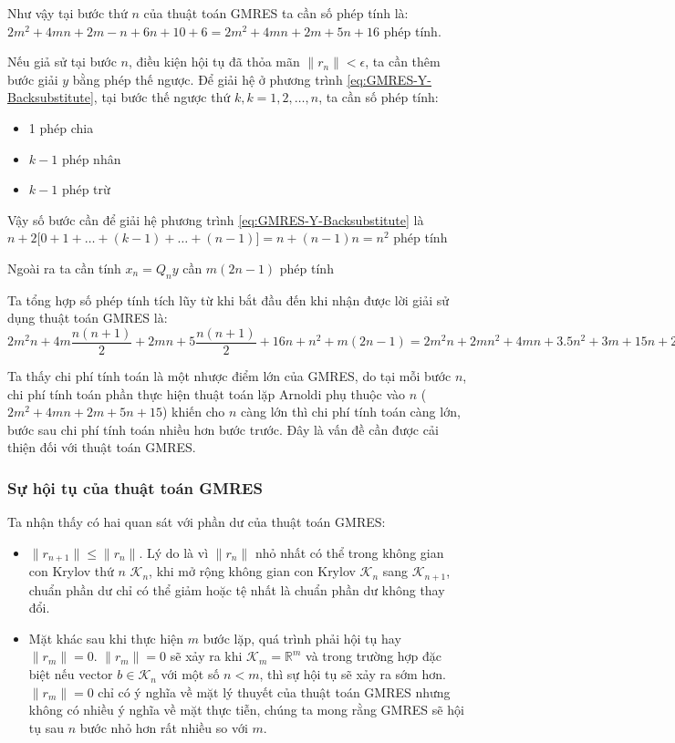 \documentclass[14pt, a4paper]{article}
\numberwithin{equation}{section}
\numberwithin{algorithm}{section}
\numberwithin{figure}{section}
\numberwithin{dl}{section}
\numberwithin{md}{section}
\numberwithin{bd}{section}
\numberwithin{dn}{section}
\begin{document}
Như vậy tại bước thứ $n$ của thuật toán GMRES ta cần số phép tính là: $2m^2+4mn+2m-n + 6n+10 + 6=2m^2+4mn+2m+5n+16$ phép tính.

Nếu giả sử tại bước $n$, điều kiện hội tụ đã thỏa mãn $\lVert r_n \rVert < \epsilon$, ta cần thêm bước giải $y$ bằng phép thế ngược. Để giải hệ ở phương trình \ref{eq:GMRES-Y-Backsubstitute}, tại bước thế ngược thứ $k, k=1,2,\dots,n$, ta cần số phép tính:
\begin{itemize}
    \item 1 phép chia
    \item $k-1$ phép nhân
    \item $k-1$ phép trừ
\end{itemize}

Vậy số bước cần để giải hệ phương trình \ref{eq:GMRES-Y-Backsubstitute} là $n + 2\lbrack 0 + 1 + \dots + (k-1) + \dots + (n-1)\rbrack=n+(n-1)n=n^2$ phép tính

Ngoài ra ta cần tính $x_n = Q_n y$ cần $m(2n-1)$ phép tính

Ta tổng hợp số phép tính tích lũy từ khi bắt đầu đến khi nhận được lời giải sử dụng thuật toán GMRES là: $2m^2 n + 4m\dfrac{n(n+1)}{2}+2mn + 5\dfrac{n(n+1)}{2}+16n+n^2+m(2n-1)=2m^2 n + 2mn^2+4mn+3.5n^2+3m+15n+2.5 \sim \mathcal{O}(2m^2n+ 2mn^2)$

Ta thấy chi phí tính toán là một nhược điểm lớn của GMRES, do tại mỗi bước $n$, chi phí tính toán phần thực hiện thuật toán lặp Arnoldi phụ thuộc vào $n$ ($2m^2+4mn+2m+5n+15$) khiến cho $n$ càng lớn thì chi phí tính toán càng lớn, bước sau chi phí tính toán nhiều hơn bước trước. Đây là vấn đề cần được cải thiện đối với thuật toán GMRES.

\subsubsection{Sự hội tụ của thuật toán GMRES} \label{GMRES-Convergence}

Ta nhận thấy có hai quan sát với phần dư của thuật toán GMRES:

\begin{itemize}
    \item $ \lVert r_{n+1} \rVert \leq \lVert r_{n} \rVert $. Lý do là vì $\lVert r_n \rVert$ nhỏ nhất có thể trong không gian con Krylov thứ $n$ $\mathcal{K}_n$, khi mở rộng không gian con Krylov $\mathcal{K}_n$ sang $\mathcal{K}_{n+1}$, chuẩn phần dư chỉ có thể giảm hoặc tệ nhất là chuẩn phần dư không thay đổi.
    \item Mặt khác sau khi thực hiện $m$ bước lặp, quá trình phải hội tụ hay $\lVert r_m \rVert=0$. $\lVert r_m \rVert = 0$ sẽ xảy ra khi $\mathcal{K}_m = \mathbb{R}^m$ và trong trường hợp đặc biệt nếu vector $b \in \mathcal{K}_n$ với một số $n < m$, thì sự hội tụ sẽ xảy ra sớm hơn. $\lVert r_m \rVert = 0$ chỉ có ý nghĩa về mặt lý thuyết của thuật toán GMRES nhưng không có nhiều ý nghĩa về mặt thực tiễn, chúng ta mong rằng GMRES sẽ hội tụ sau $n$ bước nhỏ hơn rất nhiều so với $m$.
\end{itemize}
\end{document}
